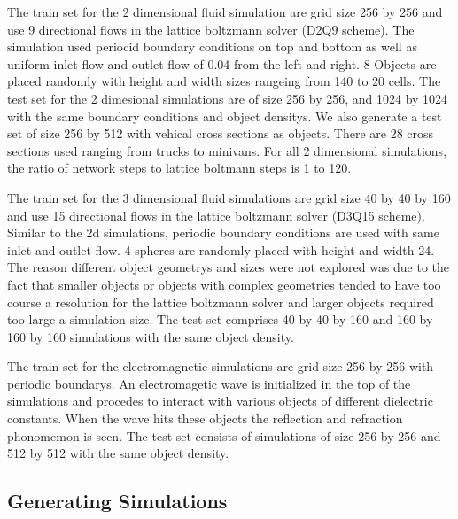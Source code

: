 \documentclass{article}
\begin{document}
The train set for the 2 dimensional fluid simulation are grid size 256 by 256 and use 9 directional flows in the lattice boltzmann solver (D2Q9 scheme)\cite{guo2013lattice}. The simulation used periocid boundary conditions on top and bottom as well as uniform inlet flow and outlet flow of 0.04 from the left and right. 8 Objects are placed randomly with height and width sizes rangeing from 140 to 20 cells. The test set for the 2 dimesional simulations are of size 256 by 256, and 1024 by 1024 with the same boundary conditions and object densitys. We also generate a test set of size 256 by 512 with vehical cross sections as objects. There are 28 cross sections used ranging from trucks to minivans. For all 2 dimensional simulations, the ratio of network steps to lattice boltmann steps is 1 to 120.

The train set for the 3 dimensional fluid simulations are grid size 40 by 40 by 160 and use 15 directional flows in the lattice boltzmann solver (D3Q15 scheme)\cite{guo2013lattice}. Similar to the 2d simulations, periodic boundary conditions are used with same inlet and outlet flow. 4 spheres are randomly placed with height and width 24. The reason different object geometrys and sizes were not explored was due to the fact that smaller objects or objects with complex geometries tended to have too course a resolution for the lattice boltzmann solver and larger objects required too large a simulation size. The test set comprises 40 by 40 by 160 and 160 by 160 by 160 simulations with the same object density.

The train set for the electromagnetic simulations are grid size 256 by 256 with periodic boundarys. An electromagetic wave is initialized in the top of the simulations and procedes to interact with various objects of different dielectric constants. When the wave hits these objects the reflection and refraction phonomemon is seen. The test set consists of simulations of size 256 by 256 and 512 by 512 with the same object density.

\subsection{Generating Simulations}
\end{document}
